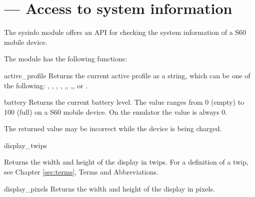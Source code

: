 %
%
%

\section{ ---
    Access to system information}
\label{sec:sysinfo}
The \textsf{sysinfo} module offers an API for checking the system 
information of a S60 mobile device. 

The  module has the following functions:

\begin{funcdesc}{active_profile}{}
Returns the current active profile as a string, which can be one of the 
following: , , , 
, ,, ,, 
or .
\end{funcdesc}

\begin{funcdesc}{battery}{}
Returns the current battery level. The value ranges from 0 (empty) to 100
(full) on a S60 mobile device. On the emulator the value is always 0. 
\begin{notice}[note] 
The returned value may be incorrect while the device is being charged.
\end{notice}

\end{funcdesc}


\begin{funcdesc}{display_twips}{}

Returns the width and height of the display in twips. For a definition of a 
twip, see Chapter \ref{sec:terms}, Terms and Abbreviations. 

\end{funcdesc}

\begin{funcdesc}{display_pixels}{}
Returns the width and height of the display in pixels.
\end{funcdesc}

